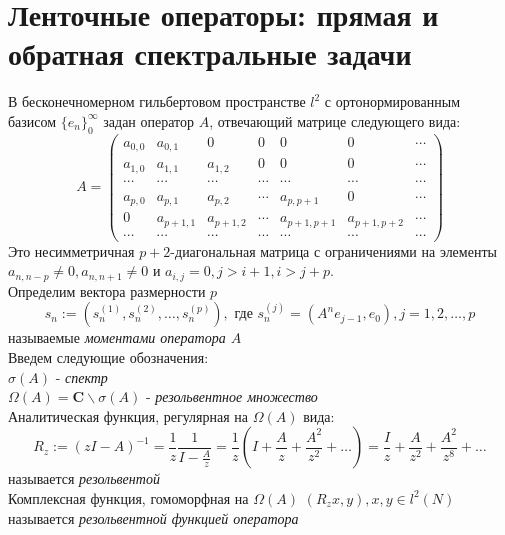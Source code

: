 \section{Ленточные операторы: прямая и обратная спектральные задачи}
В бесконечномерном гильбертовом пространстве $l^2$ с
ортонормированным базисом $\{e_n\}^\infty_0$ задан оператор $A$,
отвечающий матрице следующего вида:
\begin{equation}
\label{Operator_Matrix} A= \left(\begin{array}{ccccccc}
a_{0,0}&a_{0,1}&0&0&0&0&\cdots\\
a_{1,0}&a_{1,1}&a_{1,2}&0&0&0&\cdots\\
\cdots&\cdots&\cdots&\cdots&\cdots&\cdots&\cdots\\
a_{p,0}&a_{p,1}&a_{p,2}&\cdots&a_{p,p+1}&0&\cdots\\
0&a_{p+1,1}&a_{p+1,2}&\cdots&a_{p+1,p+1}&a_{p+1,p+2}&\cdots\\
\cdots&\cdots&\cdots&\cdots&\cdots&\cdots&\cdots
\end{array}\right)
\end{equation}
Это несимметричная $p+2$-диагональная матрица с ограничениями на
элементы $a_{n,n-p}\not=0,a_{n,n+1}\not=0$ и
$a_{i,j}=0,j>i+1,i>j+p$.\\
Определим вектора размерности $p$
\begin{equation}
\label{Moment_gector} s_n:=(s_n^{(1)},s_n^{(2)},\ldots,s_n^{(p)}),
\mbox{ где  } s_n^{(j)}=(A^ne_{j-1},e_0), j=1,2,\ldots,p
\end{equation}
называемые \emph{моментами оператора $A$} \\
Введем следующие обозначения: \\
$\sigma(A)$ - \emph{спектр} \\
$\Omega(A)=\textbf{C} \backslash\sigma(A)$ - \emph{резольвентное множество} \\
Аналитическая функция, регулярная на $\Omega(A)$ вида:
$$%
R_z:=(zI-A)^{-1}=\displaystyle\frac{1}{z}
\displaystyle\frac{1}{I-\frac{A}{z}}=\frac{1}{z}\left( I +
\frac{A}{z} +\frac{A^2}{z^2}+\ldots \right)=\frac{I}{z}
+\frac{A}{z^2}+\frac{A^2}{z^8}+\ldots
$$%
называется \emph{резольвентой} \\
Комплексная функция, гомоморфная на $\Omega(A)$
$(R_zx,y),x,y\in{l^2}(N)$ называется \emph{резольвентной функцией
оператора} \\
